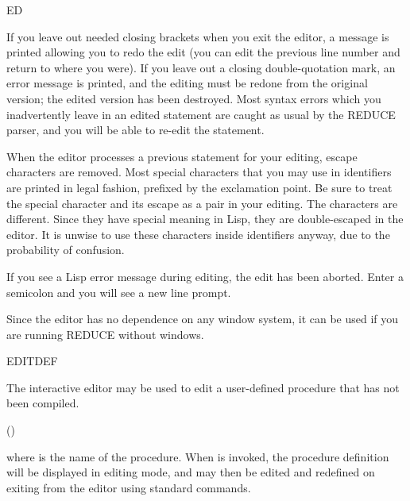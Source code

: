 \begin{Command}{ED}
\begin{Comments}
If you leave out needed closing brackets when you exit the editor, a message 
is printed allowing you to redo the edit (you can edit the previous line
number and return to where you were).  If you leave out a closing 
double-quotation mark, an error message is printed, and the editing must be
redone from the original version; the edited version has been destroyed.
Most syntax errors which you inadvertently leave in an edited statement are 
caught as usual by the REDUCE parser, and you will be able to re-edit the
statement.   

When the editor processes a previous statement for your editing, escape
characters are removed.  Most special characters that you may use in
identifiers are printed in legal fashion, prefixed by the exclamation
point.  Be sure to treat the special character and its escape as a pair in
your editing.  The characters  are different.  Since
they have special meaning in Lisp, they are double-escaped in the editor.
It is unwise to use these characters inside identifiers anyway, due to the
probability of confusion.

If you see a Lisp error message during editing, the edit has been aborted.
Enter a semicolon and you will see a new line prompt.

Since the editor has no dependence on any window system, it can be used if you
are running REDUCE without windows.
\end{Comments}
\end{Command}


\begin{Command}{EDITDEF}

The interactive editor  may be used to edit a user-defined
procedure that has not been compiled.
\begin{Syntax}
()
\end{Syntax}
where  is the name of the procedure.  When 
is invoked, the procedure definition will be displayed in editing mode,
and may then be edited and redefined on exiting from the editor using
standard  commands.

\end{Command}



